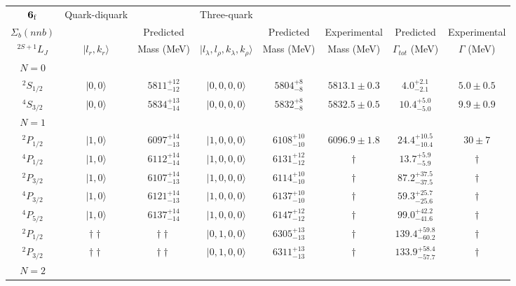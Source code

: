 \begin{tabular}{c| c c c c c c c}\hline \hline
${\bf {6}}_{\rm f}$  & Quark-diquark & & Three-quark   &             &      &        &  \\ 
$\Sigma_{b}(nnb)$ &   & Predicted  &   &  Predicted   &  Experimental &  Predicted            & Experimental \\ 
 $^{2S+1}L_{J}$ & $\vert l_{r}, k_{r} \rangle$ & Mass (MeV)  & $\vert l_{\lambda}, l_{\rho}, k_{\lambda}, k_{\rho} \rangle$  &  Mass (MeV)   &  Mass (MeV)   &  $\Gamma_{tot}$ (MeV) & $\Gamma$ (MeV) \\ \hline
\hline
 $N=0$  &  &  &  &  &  \\ 
$^{2}S_{1/2}$ & $\vert 0,0 \rangle$ & $5811^{+12}_{-12}$ & $\vert 0,0,0,0 \rangle $ & $5804^{+8}_{-8}$ & $5813.1\pm 0.3$ & $4.0^{+2.1}_{-2.1}$ & $5.0\pm 0.5$ \\ 
$^{4}S_{3/2}$ & $\vert 0,0 \rangle$ & $5834^{+13}_{-14}$ & $\vert 0,0,0,0 \rangle $ & $5832^{+8}_{-8}$ & $5832.5\pm 0.5$ & $10.4^{+5.0}_{-5.0}$ & $9.9\pm 0.9$ \\ 
\hline
 $N=1$  &  &  &  &  &  \\ 
$^{2}P_{1/2}$ & $\vert 1,0 \rangle$ & $6097^{+14}_{-13}$ & $\vert 1,0,0,0 \rangle $ & $6108^{+10}_{-10}$ & $6096.9\pm 1.8$ & $24.4^{+10.5}_{-10.4}$ & $30\pm 7$ \\ 
$^{4}P_{1/2}$ & $\vert 1,0 \rangle$ & $6112^{+14}_{-14}$ & $\vert 1,0,0,0 \rangle $ & $6131^{+12}_{-12}$ & $\dagger$ & $13.7^{+5.9}_{-5.9}$ & $\dagger$ \\ 
$^{2}P_{3/2}$ & $\vert 1,0 \rangle$ & $6107^{+14}_{-13}$ & $\vert 1,0,0,0 \rangle $ & $6114^{+10}_{-10}$ & $\dagger$ & $87.2^{+37.5}_{-37.5}$ & $\dagger$ \\ 
$^{4}P_{3/2}$ & $\vert 1,0 \rangle$ & $6121^{+14}_{-13}$ & $\vert 1,0,0,0 \rangle $ & $6137^{+10}_{-10}$ & $\dagger$ & $59.3^{+25.7}_{-25.6}$ & $\dagger$ \\ 
$^{4}P_{5/2}$ & $\vert 1,0 \rangle$ & $6137^{+14}_{-14}$ & $\vert 1,0,0,0 \rangle $ & $6147^{+12}_{-12}$ & $\dagger$ & $99.0^{+42.2}_{-41.6}$ & $\dagger$ \\ 
$^{2}P_{1/2}$ & $\dagger\dagger$ & $\dagger\dagger$ & $\vert 0,1,0,0 \rangle $ & $6305^{+13}_{-13}$ & $\dagger$ & $139.4^{+59.8}_{-60.2}$ & $\dagger$ \\ 
$^{2}P_{3/2}$ & $\dagger\dagger$ & $\dagger\dagger$ & $\vert 0,1,0,0 \rangle $ & $6311^{+13}_{-13}$ & $\dagger$ & $133.9^{+58.4}_{-57.7}$ & $\dagger$ \\ 
\hline
 $N=2$  &  &  &  &  &  \\ 

\end{tabular}

